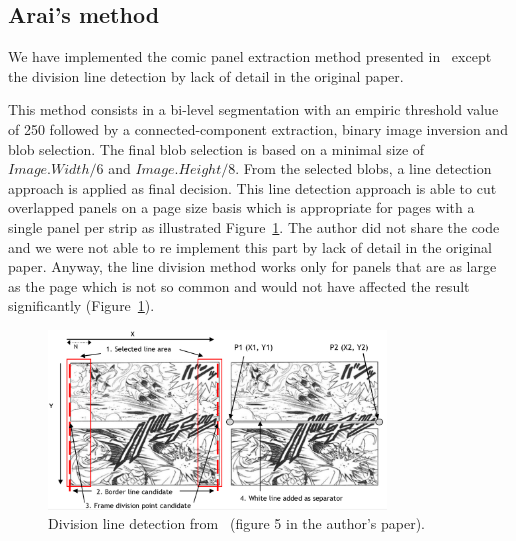 

\subsection{Arai's method} %
\label{sub:ex:panel_extraction_arai}
We have implemented the comic panel extraction method presented in~\cite{Arai10} except the division line detection by lack of detail in the original paper.

This method consists in a bi-level segmentation with an empiric threshold value of 250 followed by a connected-component extraction, binary image inversion and blob selection.
The final blob selection is based on a minimal size of $Image.Width / 6$ and $Image.Height / 8$.
From the selected blobs, a line detection approach is applied as final decision.
This line detection approach is able to cut overlapped panels on a page size basis which is appropriate for pages with a single panel per strip as illustrated Figure~\ref{fig:ex:division_line_detection}.
The author did not share the code and we were not able to re implement this part by lack of detail in the original paper.
Anyway, the line division method works only for panels that are as large as the page which is not so common and would not have affected the result significantly (Figure~\ref{fig:ex:division_line_detection}).

\begin{figure}[h!]
\begin{center}
\includegraphics[width=0.8\textwidth]{division_line_detection_arai10.png}
\caption[Division line detection for panel extraction]{Division line detection from~\cite{Arai10} (figure 5 in the author's paper).}
\label{fig:ex:division_line_detection}
\end{center}
\end{figure}

